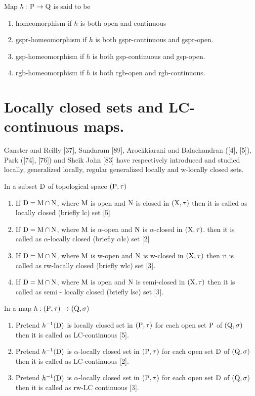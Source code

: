 \begin{dfn}\label{dfn1.4.3}
Map  $h: \mathrm{P} \rightarrow \mathrm{Q}$ is said to be 
\begin{enumerate}
\item homeomorphism if $h$ is both open and continuous
\item gspr-homeomorphism  if $h$ is both gspr-continuous and gspr-open.
\item gsp-homeomorphism  if $h$ is both gsp-continuous and gsp-open.
\item rgb-homeomorphism  if $h$ is both rgb-open and rgb-continuous.
\end{enumerate}
\end{dfn}

\section{Locally closed sets and LC-continuous maps.}

Ganster and Reilly [37], Sundaram [89], Arockkiarani and Balachandran ([4], [5]), Park ([74], [76]) and Sheik John [83] have respectively introduced and studied locally, generalized locally, regular generalized locally and w-locally closed sets. 

\begin{dfn}\label{dfn1.5.1}
In a subset $\mathrm{D}$ of topological space $(\mathrm{P}, \tau)$ 
\begin{enumerate}[\rm (i)]
\item If $\mathrm{D}=\mathrm{M} \cap \mathrm{N}$, where $\mathrm{M}$ is open and $\mathrm{N}$ is closed in $(\mathrm{X},\tau)$ then it is called as locally closed (briefly lc) set [5]
\item If $\mathrm{D}=\mathrm{M} \cap \mathrm{N}$, where $\mathrm{M}$ is $\alpha$-open and $\mathrm{N}$ is $\alpha$-closed in $(\mathrm{X}, \tau)$. then it is called as $\alpha$-locally closed (briefly $\alpha$lc) set [2]
\item If $\mathrm{D}=\mathrm{M} \cap \mathrm{N}$, where $\mathrm{M}$ is w-open and $\mathrm{N}$ is w-closed in $(\mathrm{X}, \tau)$ then it is called as rw-locally closed (briefly wlc) set [3].
\item If $\mathrm{D}=\mathrm{M} \cap \mathrm{N}$, where $\mathrm{M}$ is open and $\mathrm{N}$ is semi-closed in $(\mathrm{X}, \tau)$ then it is called as semi - locally closed (briefly lsc) set [3].
\end{enumerate}
\end{dfn}

\begin{dfn}\label{dfn1.5.2} 
In a map $h: (\mathrm{P}, \tau) \rightarrow (\mathrm{Q}, \sigma)$ 
\begin{enumerate}[\rm (i)]
\item Pretend $h^{-1}(\mathrm{D})$ is locally closed set in $(\mathrm{P}, \tau)$ for each open set $\mathrm{P}$ of $(\mathrm{Q}, \sigma)$ then it is called as LC-continuous [5].
\item Pretend $h^{-1}(\mathrm{D})$ is $\alpha$-locally closed set in $(\mathrm{P}, \tau)$ for each open set $\mathrm{D}$ of $(\mathrm{Q}, \sigma)$ then it is called as LC-continuous [2].
\item Pretend $h^{-1}(\mathrm{D})$ is $\alpha$-locally closed set in $(\mathrm{P},\tau)$ for each open set $\mathrm{D}$ of $(\mathrm{Q}, \sigma)$ then it is called as rw-LC continuous [3].
\end{enumerate}
\end{dfn}

